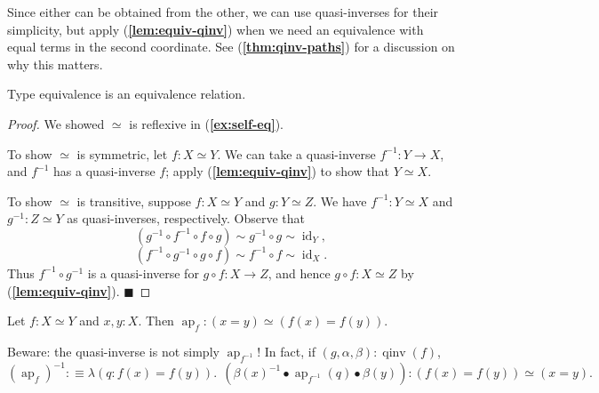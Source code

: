 \documentclass{article}
\renewcommand{\qed}{\hfill{\color{MPBthm}\( \blacksquare \)}}
\newcommand{\eql}{\mathbin{:\equiv}}
\newcommand{\1}{\textbf{1}}
\newcommand{\0}{\mathbf{0}}
\newcommand{\2}{\textbf{2}}
\DeclareMathOperator{\ap}{ap}
\DeclareMathOperator{\id}{id}
\DeclareMathOperator{\qinv}{qinv}
\begin{document}
Since either can be obtained from the other, we can use quasi-inverses for their simplicity, but apply (\textbf{\color{MPBthm}\ref{lem:equiv-qinv}}) when we need an equivalence with equal terms in the second coordinate. See (\textbf{\color{MPBthm}\ref{thm:qinv-paths}}) for a discussion on why this matters.
\begin{thm}{}{} Type equivalence is an equivalence relation.
\begin{proof}
	We showed \( \simeq \) is reflexive in (\textbf{\color{MPBexample}\ref{ex:self-eq}}).
	
	To show \( \simeq \) is symmetric, let \( f : X \simeq Y \). We can take a quasi-inverse \( f^{-1} : Y \to X \), and \( f^{-1} \) has a quasi-inverse \( f \); apply (\textbf{\color{MPBthm}\ref{lem:equiv-qinv}}) to show that \( Y \simeq X \).
	
	To show \( \simeq \) is transitive, suppose \( f : X \simeq Y \) and \( g : Y \simeq Z \). We have \( f^{-1} : Y \simeq X \) and \( g^{-1} : Z \simeq Y \) as quasi-inverses, respectively. Observe that
	\[ (g^{-1} \circ f^{-1} \circ f \circ g) \sim g^{-1} \circ g \sim \id_{Y}, \]
	\[ (f^{-1} \circ g^{-1} \circ g \circ f) \sim f^{-1} \circ f \sim \id_{X}. \]
	Thus \( f^{-1} \circ g^{-1} \) is a quasi-inverse for \( g \circ f : X \to Z \), and hence \( g \circ f : X \simeq Z \) by (\textbf{\color{MPBthm}\ref{lem:equiv-qinv}}). \qed
\end{proof} \end{thm}
\begin{corollary}{}{} Let \( f : X \simeq Y \) and \( x, y : X \). Then \( \ap_{f} : (x = y) \simeq (f(x) = f(y)) \).

Beware: the quasi-inverse is not simply \( \ap_{f^{-1}} \)! In fact, if \( (g, \alpha, \beta) : \qinv(f) \),
\[ {(\ap_{f})^{-1}} \eql \lambda(q : f(x) = f(y)).~~(\beta(x)^{-1} \bullet \ap_{f^{-1}}(q) \bullet \beta(y)) : (f(x) = f(y)) \simeq (x = y). \]
\end{corollary}
\end{document}

